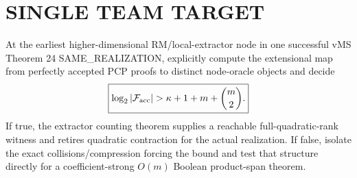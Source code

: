 \documentclass[11pt]{article}
\begin{document}
\section*{SINGLE TEAM TARGET}
At the earliest higher-dimensional RM/local-extractor node in one successful vMS Theorem 24 SAME_REALIZATION, explicitly compute the extensional map from perfectly accepted PCP proofs to distinct node-oracle objects and decide
\[
\boxed{\log_2|\mathcal F_{\rm acc}|>\kappa+1+m+\binom m2.}
\]
If true, the extractor counting theorem supplies a reachable full-quadratic-rank witness and retires quadratic contraction for the actual realization. If false, isolate the exact collisions/compression forcing the bound and test that structure directly for a coefficient-strong $O(m)$ Boolean product-span theorem.
\end{document}
